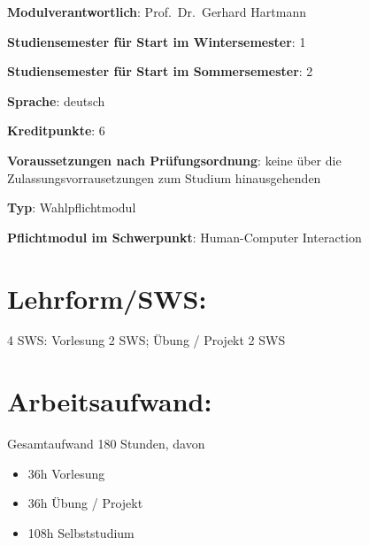 \begin{modulHead}
\textbf{Modulverantwortlich}: Prof.~Dr.~Gerhard
Hartmann
\end{modulHead}
\begin{modulHead}
\textbf{Studiensemester für
Start im Wintersemester}:
1
\end{modulHead}
\begin{modulHead}
\textbf{Studiensemester für Start
im Sommersemester}:
2
\end{modulHead}
\begin{modulHead}
\textbf{Sprache}:
deutsch
\end{modulHead}
\begin{modulHead}
\textbf{Kreditpunkte}:
6
\end{modulHead}
\begin{modulHead}
\textbf{Voraussetzungen nach
Prüfungsordnung}: keine über die Zulassungsvorrausetzungen zum Studium
hinausgehenden
\end{modulHead}
\begin{modulHead}
\textbf{Typ}:
Wahlpflichtmodul
\end{modulHead}
\begin{modulHead}
\textbf{Pflichtmodul
im Schwerpunkt}: Human-Computer Interaction
\end{modulHead}


\section*{Lehrform/SWS:\label{/mi-2017/modulbeschreibungen-master/MA_HCI_Sketching_and_Designing_for_User_Experience}}\label{lehrformswspathlabelmi-2017modulbeschreibungen-mastermaux5fhciux5fsketchingux5fandux5fdesigningux5fforux5fuserux5fexperience}

4 SWS: Vorlesung 2 SWS; Übung / Projekt 2 SWS

\section*{Arbeitsaufwand:\label{/mi-2017/modulbeschreibungen-master/MA_HCI_Sketching_and_Designing_for_User_Experience}}\label{arbeitsaufwandpathlabelmi-2017modulbeschreibungen-mastermaux5fhciux5fsketchingux5fandux5fdesigningux5fforux5fuserux5fexperience}

Gesamtaufwand 180 Stunden, davon

\begin{itemize}
\tightlist
\item
  36h Vorlesung
\item
  36h Übung / Projekt
\item
  108h Selbststudium
\end{itemize}

